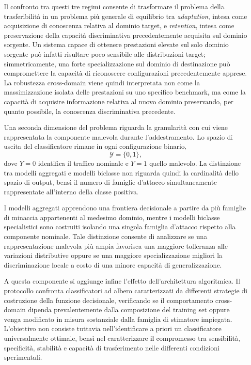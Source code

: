 Il confronto tra questi tre regimi consente di trasformare il problema della trasferibilità in un problema più generale di equilibrio tra \textit{adaptation}, intesa come acquisizione di conoscenza relativa al dominio target, e \textit{retention}, intesa come preservazione della capacità discriminativa precedentemente acquisita sul dominio sorgente.
Un sistema capace di ottenere prestazioni elevate sul solo dominio sorgente può infatti risultare poco sensibile alle distribuzioni target; simmetricamente, una forte specializzazione sul dominio di destinazione può compromettere la capacità di riconoscere configurazioni precedentemente apprese. 
La robustezza cross-domain viene quindi interpretata non come la massimizzazione isolata delle prestazioni su uno specifico benchmark, ma come la capacità di acquisire informazione relativa al nuovo dominio preservando, per quanto possibile, la conoscenza discriminativa precedente.

Una seconda dimensione del problema riguarda la granularità con cui viene rappresentata la componente malevola durante l'addestramento. 
Lo spazio di uscita del classificatore rimane in ogni configurazione binario,
\begin{equation}
    \mathcal{Y} = \{0,1\},
\end{equation}
dove $Y=0$ identifica il traffico nominale e $Y=1$ quello malevolo. 
La distinzione tra modelli aggregati e modelli biclasse non riguarda quindi la cardinalità dello spazio di output, bensì il numero di famiglie d'attacco simultaneamente rappresentate all'interno della classe positiva.

I modelli aggregati apprendono una frontiera decisionale a partire da più famiglie di minaccia appartenenti al medesimo dominio, mentre i modelli biclasse specialistici sono costruiti isolando una singola famiglia d'attacco rispetto alla componente nominale. 
Tale distinzione consente di analizzare se una rappresentazione malevola più ampia favorisca una maggiore tolleranza alle variazioni distributive oppure se una maggiore specializzazione migliori la discriminazione locale a costo di una minore capacità di generalizzazione.

A questa componente si aggiunge infine l'effetto dell'architettura algoritmica. 
Il protocollo confronta classificatori ad albero caratterizzati da differenti strategie di costruzione della funzione decisionale, verificando se il comportamento cross-domain dipenda prevalentemente dalla composizione del training set oppure venga modificato in misura sostanziale dalla famiglia di stimatore impiegata. 
L'obiettivo non consiste tuttavia nell'identificare a priori un classificatore universalmente ottimale, bensì nel caratterizzare il compromesso tra sensibilità, specificità, stabilità e capacità di trasferimento nelle differenti condizioni sperimentali.


